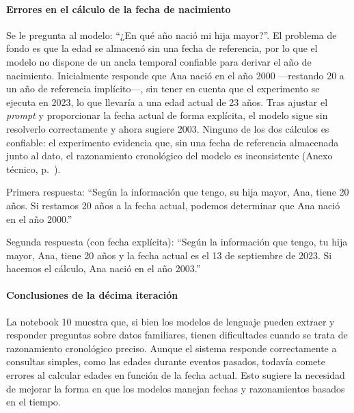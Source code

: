 \paragraph{Errores en el cálculo de la fecha de nacimiento}

Se le pregunta al modelo: ``¿En qué año nació mi hija mayor?''. El problema de fondo es que la edad se almacenó sin una fecha de referencia, por lo que el modelo no dispone de un ancla temporal confiable para derivar el año de nacimiento. Inicialmente responde que Ana nació en el año 2000 —restando 20 a un año de referencia implícito—, sin tener en cuenta que el experimento se ejecuta en 2023, lo que llevaría a una edad actual de 23 años. Tras ajustar el \textit{prompt} y proporcionar la fecha actual de forma explícita, el modelo sigue sin resolverlo correctamente y ahora sugiere 2003. Ninguno de los dos cálculos es confiable: el experimento evidencia que, sin una fecha de referencia almacenada junto al dato, el razonamiento cronológico del modelo es inconsistente (Anexo técnico, p.~\pageref{anexo:code-4-1-10-6}).

Primera respuesta: ``Según la información que tengo, su hija mayor, Ana, tiene 20 años. Si restamos 20 años a la fecha actual, podemos determinar que Ana nació en el año 2000.''

Segunda respuesta (con fecha explícita): ``Según la información que tengo, tu hija mayor, Ana, tiene 20 años y la fecha actual es el 13 de septiembre de 2023. Si hacemos el cálculo, Ana nació en el año 2003.''

\paragraph{Conclusiones de la décima iteración}

La notebook 10 muestra que, si bien los modelos de lenguaje pueden extraer y responder preguntas sobre datos familiares, tienen dificultades cuando se trata de razonamiento cronológico preciso. Aunque el sistema responde correctamente a consultas simples, como las edades durante eventos pasados, todavía comete errores al calcular edades en función de la fecha actual. Esto sugiere la necesidad de mejorar la forma en que los modelos manejan fechas y razonamientos basados en el tiempo. 